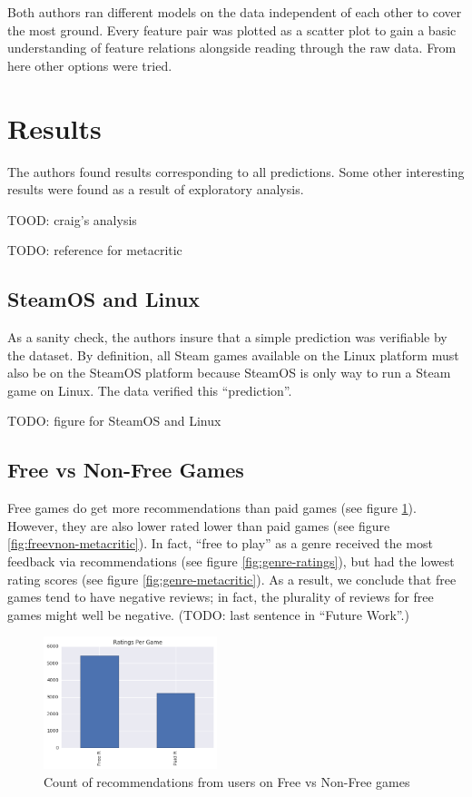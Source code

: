 \documentclass[letterpaper,10pt,twocolumn]{article}
\begin{document}
Both authors ran different models on the data independent of each other to
cover the most ground. Every feature pair was plotted as a scatter plot to
gain a basic understanding of feature relations alongside reading through the
raw data. From here other options were tried.



\section{Results}

The authors found results corresponding to all predictions. Some other interesting
results were found as a result of exploratory analysis.

TOOD: craig's analysis

TODO: reference for metacritic

\subsection{SteamOS and Linux}

As a sanity check, the authors insure that a simple prediction was verifiable
by the dataset. By definition, all Steam games available on the Linux platform
must also be on the SteamOS platform because SteamOS is only way to run a Steam
game on Linux. The data verified this ``prediction''.

TODO: figure for SteamOS and Linux

\subsection{Free vs Non-Free Games}

Free games do get more recommendations than paid games (see figure
\ref{fig:freevnon-ratings}). However, they are also lower rated lower than paid
games (see figure \ref{fig:freevnon-metacritic}). In fact, ``free to play'' as a
genre received the most feedback via recommendations (see figure
\ref{fig:genre-ratings}), but had the lowest rating scores (see figure
\ref{fig:genre-metacritic}). As a result, we conclude that free games tend to
have negative reviews; in fact, the plurality of reviews for free games might
well be negative. (TODO: last sentence in ``Future Work''.)

\begin{figure}[H]
    \label{fig:freevnon-ratings}
    \caption{Count of recommendations from users on Free vs Non-Free games}
    \includegraphics[width=0.45\textwidth,keepaspectratio]{freevnon-ratings-bar}
\end{figure}
\end{document}
